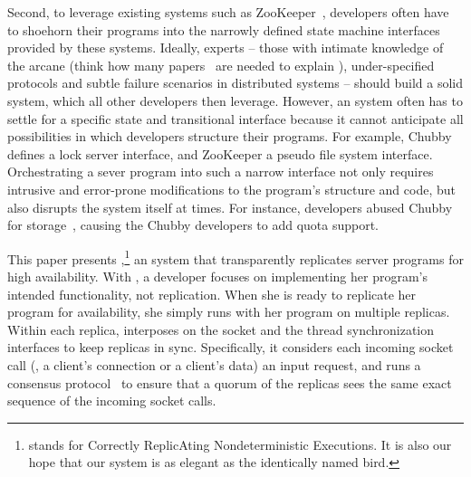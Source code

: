 Second, to leverage existing \smr systems such as
ZooKeeper~\cite{zookeeper}, developers often have to shoehorn their
programs into the narrowly defined state machine interfaces provided by
these \smr systems.  Ideally, experts -- those with intimate knowledge of
the arcane (think how many 
papers~\cite{paxos,paxos:simple,paxos:complex,paxos:live,paxos:practical} are 
needed to explain \paxos),
under-specified~\cite{paxos:practical} \smr protocols and subtle failure
scenarios in distributed systems -- should build a solid \smr system,
which all other developers then leverage. However, an \smr system often
has to settle for a specific state and transitional interface because it
cannot anticipate all possibilities in which developers structure their
programs.  For example, Chubby~\cite{chubby:osdi} defines a lock server
interface, and ZooKeeper a pseudo file system interface.  Orchestrating a
sever program into such a narrow interface not only requires
intrusive and error-prone modifications to the program's structure and
code, but also disrupts the \smr system itself at times. For instance,
developers abused Chubby for storage~\cite{chubby:osdi}, causing the
Chubby developers to add quota support.


This paper presents \xxx,\footnote{\xxx stands for Correctly ReplicAting
  Nondeterministic Executions. It is also our hope that our system is as
  elegant as the identically named bird.} an \smr system that
transparently replicates server programs for high availability.  With
\xxx, a developer focuses on implementing her program's intended
functionality, not replication.  When she is ready to replicate her
program for availability, she simply runs \xxx with her program on
multiple replicas.  Within each replica, \xxx interposes on the socket and
the thread synchronization interfaces to keep replicas in sync.
Specifically, it considers each incoming socket call (\eg, \accept a
client's connection or \recv a client's data) an input request, and
runs a \paxos consensus protocol~\cite{paxos:practical} to ensure that a
quorum of the replicas sees the same exact sequence of the incoming socket calls.


